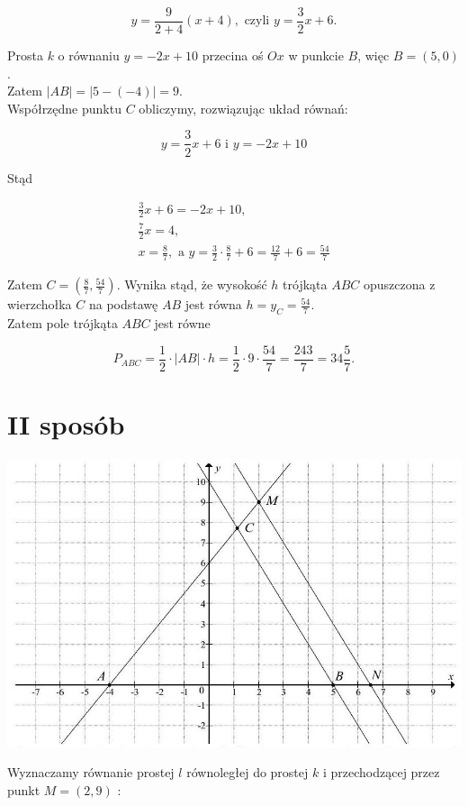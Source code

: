 \documentclass[10pt]{article}
\begin{document}
$$
y=\frac{9}{2+4}(x+4), \text { czyli } y=\frac{3}{2} x+6 .
$$

Prosta $k$ o równaniu $y=-2 x+10$ przecina oś $O x$ w punkcie $B$, więc $B=(5,0)$.\\
Zatem $|A B|=|5-(-4)|=9$.\\
Współrzędne punktu $C$ obliczymy, rozwiązując układ równań:

$$
y=\frac{3}{2} x+6 \text { i } y=-2 x+10
$$

Stąd

$$
\begin{gathered}
\frac{3}{2} x+6=-2 x+10, \\
\frac{7}{2} x=4, \\
x=\frac{8}{7}, \text { a } y=\frac{3}{2} \cdot \frac{8}{7}+6=\frac{12}{7}+6=\frac{54}{7}
\end{gathered}
$$

Zatem $C=\left(\frac{8}{7}, \frac{54}{7}\right)$. Wynika stąd, że wysokość $h$ trójkąta $A B C$ opuszczona z wierzchołka $C$ na podstawę $A B$ jest równa $h=y_{C}=\frac{54}{7}$.\\
Zatem pole trójkąta $A B C$ jest równe

$$
P_{A B C}=\frac{1}{2} \cdot|A B| \cdot h=\frac{1}{2} \cdot 9 \cdot \frac{54}{7}=\frac{243}{7}=34 \frac{5}{7} .
$$

\section*{II sposób}
\begin{center}
\includegraphics[max width=\textwidth]{2025_02_07_e35f706dbfcfb4be75cfg-18}
\end{center}

Wyznaczamy równanie prostej $l$ równoległej do prostej $k$ i przechodzącej przez punkt $M=(2,9)$ :
\end{document}
